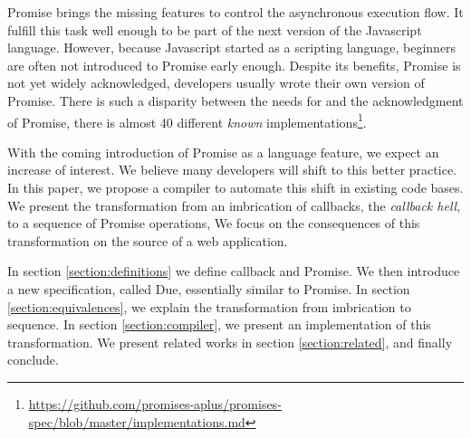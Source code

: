 Promise brings the missing features to control the asynchronous execution flow.
It fulfill this task well enough to be part of the next version of the Javascript language.
However, because Javascript started as a scripting language, beginners are often not introduced to Promise early enough.
Despite its benefits, Promise is not yet widely acknowledged, developers usually wrote their own version of Promise.
There is such a disparity between the needs for and the acknowledgment of Promise, there is almost 40 different \textit{known} implementations\footnote{\url{https://github.com/promises-aplus/promises-spec/blob/master/implementations.md}}.

With the coming introduction of Promise as a language feature, we expect an increase of interest.
We believe many developers will shift to this better practice.
In this paper, we propose a compiler to automate this shift in existing code bases.
We present the transformation from an imbrication of callbacks, the \textit{callback hell}, to a sequence of Promise operations,
We focus on the consequences of this transformation on the source of a web application.

In section \ref{section:definitions} we define callback and Promise.
We then introduce a new specification, called Due, essentially similar to Promise.
In section \ref{section:equivalences}, we explain the transformation from imbrication to sequence.
In section \ref{section:compiler}, we present an implementation of this transformation.
We present related works in section \ref{section:related}, and finally conclude.